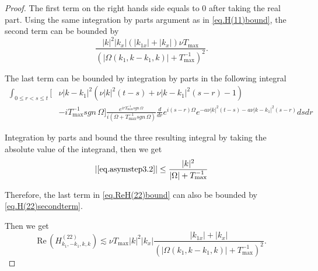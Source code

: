\begin{proof}
The first term on the right hands side equals to $0$ after taking the real part. Using the same integration by parts argument as in \eqref{eq.H(11)bound}, the second term can be bounded by 
\begin{equation}\label{eq.H(22)secondterm}
    \frac{|k|^2|k_x|(|k_{1x}|+|k_x|)\nu T_{\text{max}}}{(|\Omega(k_1,k-k_1,k)|+T^{-1}_{\text{max}})^2}.
\end{equation}

The last term can be bounded by integration by parts in the following integral
\begin{equation}\label{eq.asymstep3.2}
\begin{split}
    \int_{0\le r<s\le t}\big[&\nu|k-k_1|^2(\nu|k|^2(t-s)+\nu|k-k_1|^2(s-r)-1)
    \\
    & -iT^{-1}_{\text{max}}sgn\, \Omega\big]\frac{e^{irT^{-1}_{\text{max}}sgn\, \Omega}}{i(\Omega+T^{-1}_{\text{max}}sgn\, \Omega)}\frac{d}{dr}e^{i (s-r)\Omega}e^{- a\nu|k|^2(t-s)-a\nu|k-k_1|^2(s-r)}  dsdr
\end{split}
\end{equation}

Integration by parts and bound the three resulting integral by taking the absolute value of the integrand, then we get 
\begin{equation}
|\eqref{eq.asymstep3.2}|\le  \frac{|k|^2}{|\Omega|+T^{-1}_{\text{max}}}
\end{equation}

Therefore, the last term in \eqref{eq.ReH(22)bound} can also be bounded by \eqref{eq.H(22)secondterm}.

Then we get 
\begin{equation}
    \text{Re}\,\left(H^{(22)}_{k_1,-k_1,k,k}\right)\lesssim \nu T_{\text{max}}|k|^2|k_x|\frac{|k_{1x}|+|k_x|}{(|\Omega(k_1,k-k_1,k)|+T^{-1}_{\text{max}})^2}.
\end{equation}


\end{proof}
